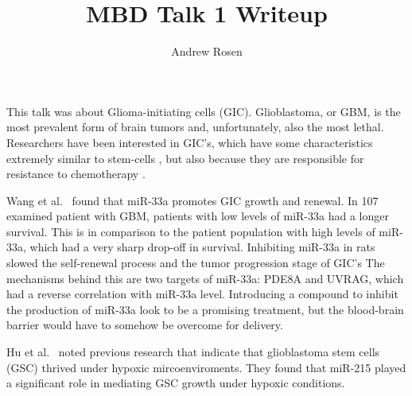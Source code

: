 \documentclass[10pt,letterpaper]{article}
\author{Andrew Rosen}
\title{MBD Talk 1 Writeup}
\begin{document}
	\maketitle
	This talk was about Glioma-initiating cells (GIC).
	Glioblastoma, or GBM, is the most prevalent form of brain tumors and, unfortunately, also the most lethal.
	Researchers have been interested in GIC's, which have some characteristics extremely similar to stem-cells \cite{wang2014mir}, but also because they are responsible for resistance to chemotherapy \cite{bao2006glioma}.
	
	
	Wang et al.\ \cite{wang2014mir} found that miR-33a promotes GIC growth and renewal.
	In 107 examined patient with GBM, patients with low levels of miR-33a had a longer survival.
	This is in comparison to the patient population with high levels of miR-33a, which had a very sharp drop-off in survival.
	Inhibiting miR-33a in rats slowed the self-renewal process and the tumor progression stage of GIC's 
	The mechanisms behind this are two targets of miR-33a: PDE8A and UVRAG, which had a reverse correlation with miR-33a level.
	Introducing a compound to inhibit the production of miR-33a look to be a promising treatment, but the blood-brain barrier would have to somehow be overcome for delivery.
	
	Hu et al.\ \cite{hu2014roles} noted previous research that indicate that glioblastoma stem cells (GSC) thrived under hypoxic mircoenviroments.
	They found that miR-215 played a significant role in mediating GSC growth under hypoxic conditions.
	
	
	
	
	
	
\end{document}
